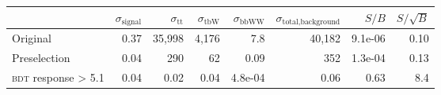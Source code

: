 \begin{tabular}{lrrrrrrr}
\toprule
{} &  $\sigma_\text{signal}$ &  $\sigma_\text{tt}$ &  $\sigma_\text{tbW}$ &  $\sigma_\text{bbWW}$ &  $\sigma_\text{total,background}$ &   $S/B$ &  $S/\sqrt{B}$ \\
\midrule
Original           &               0.37 &          35,998 &           4,176 &              7.8 &             40,182 & 9.1e-06 &          0.10 \\
Preselection &               0.04 &             290 &              62 &             0.09 &                352 & 1.3e-04 &          0.13 \\
\textsc{bdt} response > 5.1      &               0.04 &            0.02 &            0.04 &          4.8e-04 &               0.06 &    0.63 &           8.4 \\
\bottomrule
\end{tabular}
